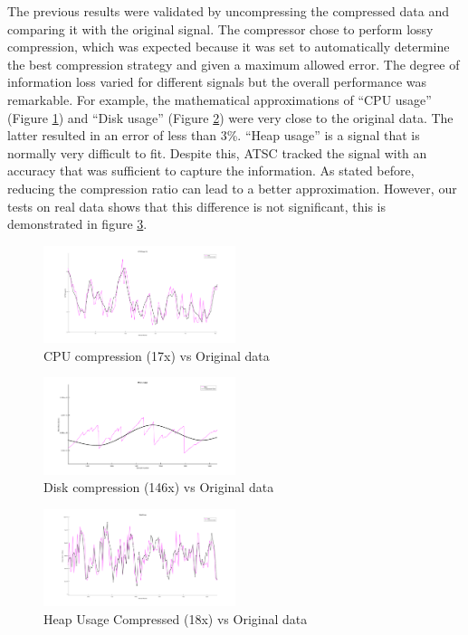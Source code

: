 \documentclass[conference]{IEEEtran}
\begin{document}
The previous results were validated by uncompressing the compressed data and comparing it with the original signal. The compressor chose to perform lossy compression, which was expected because it was set to automatically determine the best compression strategy and given a maximum allowed error. The degree of information loss varied for different signals but the overall performance was remarkable. For example, the mathematical approximations of “CPU usage” (Figure \ref{fig:cpu}) and “Disk usage” (Figure \ref{fig:disk}) were very close to the original data. The latter resulted in an error of less than 3\%. “Heap usage” is a signal that is normally very difficult to fit. Despite this, ATSC tracked the signal with an accuracy that was sufficient to capture the information.
As stated before, reducing the compression ratio can lead to a better approximation. However, our tests on real data shows that this difference is not significant, this is demonstrated in figure \ref{fig:heap}. 

\begin{figure}[h]
  \centering
  \includegraphics[width=0.5\textwidth]{cpu-usage-validation-2.png}
  \caption{CPU compression (17x) vs Original data}
  \label{fig:cpu}
\end{figure}


\begin{figure}[h]
    \centering
    \includegraphics[width=0.5\textwidth]{disk-usage-validation-2.png}
    \caption{Disk compression (146x) vs Original data}
    \label{fig:disk}
  \end{figure}


  \begin{figure}[h]
    \centering
    \includegraphics[width=0.5\textwidth]{heap-usage-validation-2.png}
    \caption{Heap Usage Compressed (18x) vs Original data}
    \label{fig:heap}
  \end{figure}
\vspace{10pt}
\end{document}
